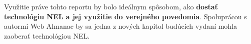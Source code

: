 Využitie práve tohto reportu by bolo ideálnym spôsobom, ako \textbf{dostať technológiu NEL a jej využitie do verejného povedomia}. 
Spoluprácou s autormi Web Almanac by sa jedna z nových kapitol budúcich vydaní mohla zaoberať technológiou NEL.








